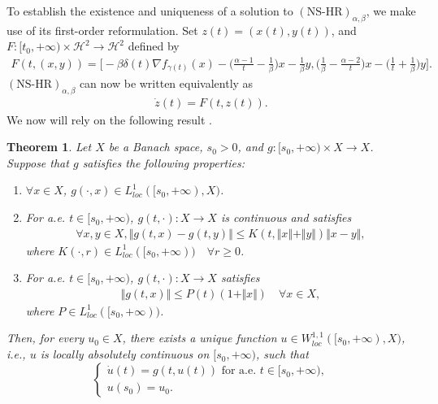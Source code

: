 \documentclass[11pt]{article}
\numberwithin{equation}{section}
\newtheorem{theorem}{Theorem}[section]
\begin{document}
To establish the existence and uniqueness of a solution to $(\text{NS-HR})_{\alpha,\beta}$, we make use of its first-order reformulation. Set $z(t)=(x(t),y(t))$, and $F:[t_0,+\infty)\times\mathcal{H}^2\to\mathcal{H}^2$ defined by 
\begin{align}\label{1stds}
    F(t,(x,y))=\Big[-\beta\delta(t)\nabla f_{\gamma(t)}(x)-\Big(\frac{\alpha-1}{t}-\frac{1}{\beta}\Big)x-\frac{1}{\beta}y, \Big(\frac{1}{\beta}-\frac{\alpha-2}{t}\Big)x-\Big(\frac{1}{t}+\frac{1}{\beta}\Big)y\Big].
\end{align}
$(\text{NS-HR})_{\alpha,\beta}$ can now be written equivalently as 
\begin{align*}
    \dot{z}(t)=F(t,z(t)).
\end{align*}
We now will rely on the following result \cite[Proposition 6.2.1]{Haraux}.
\begin{theorem} \cite[Proposition 6.2.1]{Haraux}
\label{thm:existence_uniqueness}
    Let $X$ be a Banach space, $s_0>0$, and  $g:[s_0,+\infty)\times X \longrightarrow X$. Suppose that $g$ satisfies the following properties:
    \begin{enumerate}[label=(\roman*)]
        \item $\forall x\in X$, $g(\cdot,x) \in L^1_{loc}([s_0,+\infty),X)$. 
        \item For a.e. $t \in [s_0,+\infty)$, $g(t,\cdot):X\longrightarrow X$ is continuous and satisfies 
        \begin{align*}
            \forall x, y \in X, \Vert g(t,x)-g(t,y) \Vert \le K(t,\Vert x\Vert +\Vert y \Vert)\Vert x-y\Vert,
        \end{align*}
        where $K(\cdot,r) \in L^1_{loc}([s_0,+\infty)) \quad \forall r\geq 0$. 
        \item For a.e. $t \in [s_0,+\infty)$, $g(t,\cdot):X\longrightarrow X$ satisfies 
        \begin{align*}
            \Vert g(t,x) \Vert \le P(t)(1+\Vert x \Vert) \quad \forall x \in X,
        \end{align*}
        where $P \in L^1_{loc}([s_0,+\infty))$.
    \end{enumerate}
    Then, for every $u_0 \in X$, there exists a unique function $u \in W^{1,1}_{loc}([s_0,+\infty),X)$, i.e., $u$ is locally absolutely continuous on $[s_0,+\infty)$, such that 
    $$
    \begin{cases}
        \dot{u}(t)=g(t,u(t)) \text{ for a.e. } t \in [s_0,+\infty), \\
        u(s_0)=u_0.
    \end{cases}
    $$
\end{theorem}
\end{document}

